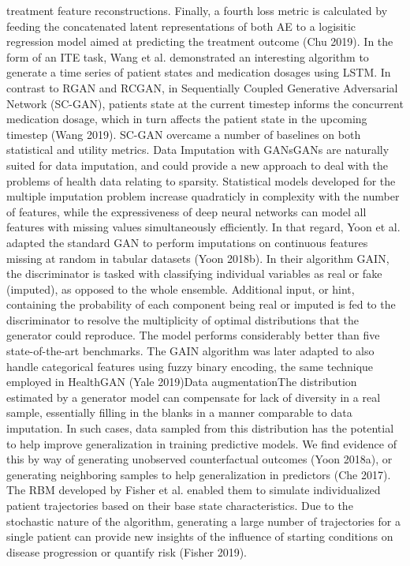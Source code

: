 treatment feature reconstructions. Finally, a fourth loss metric is calculated by feeding the concatenated latent representations of both AE to a logisitic regression model aimed at predicting the treatment outcome (Chu 2019). In the form of an ITE task, Wang et al. demonstrated an interesting algorithm to generate a time series of patient states and medication dosages using LSTM. In contrast to RGAN and RCGAN, in Sequentially Coupled Generative Adversarial Network (SC-GAN), patients state at the current timestep informs the concurrent medication dosage, which in turn affects the patient state in the upcoming timestep (Wang 2019). SC-GAN overcame a number of baselines on both statistical and utility metrics. Data Imputation with GANsGANs are naturally suited for data imputation, and could provide a new approach to deal with the problems of health data relating to sparsity. Statistical models developed for the multiple imputation problem increase quadraticly in complexity with the number of features, while the expressiveness of deep neural networks can model all features with missing values simultaneously efficiently. In that regard, Yoon et al. adapted the standard GAN to perform imputations on continuous features missing at random in tabular datasets (Yoon 2018b). In their algorithm GAIN, the discriminator is tasked with classifying individual variables as real or fake (imputed), as opposed to the whole ensemble. Additional input, or hint, containing the probability of each component being real or imputed is fed to the discriminator to resolve the multiplicity of optimal distributions that the generator could reproduce. The model performs considerably better than five state-of-the-art benchmarks. The GAIN algorithm was later adapted to also handle categorical features using fuzzy binary encoding, the same technique employed in HealthGAN (Yale 2019)Data augmentationThe distribution estimated by a generator model can compensate for lack of diversity in a real sample, essentially filling in the blanks in a manner comparable to data imputation. In such cases, data sampled from this distribution has the potential to help improve generalization in training predictive models. We find evidence of this by way of generating unobserved counterfactual outcomes (Yoon 2018a), or generating neighboring samples to help generalization in predictors (Che 2017). The RBM developed by Fisher et al. enabled them to simulate individualized patient trajectories based on their base state characteristics. Due to the stochastic nature of the algorithm, generating a large number of trajectories for a single patient can provide new insights of the influence of starting conditions on disease progression or quantify risk (Fisher 2019).
